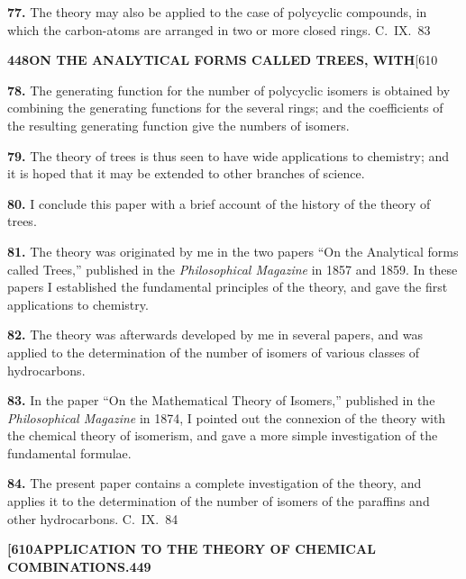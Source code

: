 \documentclass[11pt,a4paper]{book}
\begin{document}
{\medskip
\noindent\textbf{77.}
The theory may also be applied to the case of polycyclic compounds, in which the carbon-atoms are arranged in two or more closed rings.
\hfill C.~IX.\ 83

\newpage
\noindent\textbf{448}\hspace{\fill}\textbf{ON THE ANALYTICAL FORMS CALLED TREES, WITH}\hspace{\fill}[610

\noindent\textbf{78.}
The generating function for the number of polycyclic isomers is obtained by combining the generating functions for the several rings; and the coefficients of the resulting generating function give the numbers of isomers.

\medskip
\noindent\textbf{79.}
The theory of trees is thus seen to have wide applications to chemistry; and it is hoped that it may be extended to other branches of science.

\medskip
\noindent\textbf{80.}
I conclude this paper with a brief account of the history of the theory of trees.

\medskip
\noindent\textbf{81.}
The theory was originated by me in the two papers ``On the Analytical forms called Trees,'' published in the \textit{Philosophical Magazine} in 1857 and 1859. In these papers I established the fundamental principles of the theory, and gave the first applications to chemistry.

\medskip
\noindent\textbf{82.}
The theory was afterwards developed by me in several papers, and was applied to the determination of the number of isomers of various classes of hydrocarbons.

\medskip
\noindent\textbf{83.}
In the paper ``On the Mathematical Theory of Isomers,'' published in the \textit{Philosophical Magazine} in 1874, I pointed out the connexion of the theory with the chemical theory of isomerism, and gave a more simple investigation of the fundamental formulae.

\medskip
\noindent\textbf{84.}
The present paper contains a complete investigation of the theory, and applies it to the determination of the number of isomers of the paraffins and other hydrocarbons.
\hfill C.~IX.\ 84

\newpage
\noindent\textbf{[610}\hspace{\fill}\textbf{APPLICATION TO THE THEORY OF CHEMICAL COMBINATIONS.}\hspace{\fill}\textbf{449}

}
\end{document}
